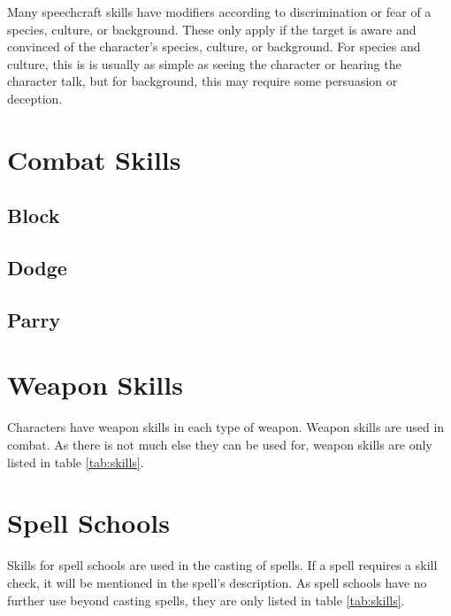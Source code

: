 \begin{multicols*}{2}
    Many speechcraft skills have modifiers according to discrimination or fear of
    a species, culture, or background. These only apply if the target is aware and
    convinced of the character's species, culture, or background. For species and
    culture, this is is usually as simple as seeing the character or hearing the
    character talk, but for background, this may require some persuasion or
    deception.

    \section{Combat Skills}

    \subsection*{Block}\label{skill:block}

    \subsection*{Dodge}\label{skill:dodge}

    \subsection*{Parry}\label{skill:parry}

    \section{Weapon Skills}\label{weapon-skills}
    Characters have weapon skills in each type of weapon. Weapon skills are used in
    combat. As there is not much else they can be used for, weapon skills are only
    listed in table \ref{tab:skills}.


    \section{Spell Schools}\label{spell-schools}
    Skills for spell schools are used in the casting of spells. If a spell requires
    a skill check, it will be mentioned in the spell's description. As spell
    schools have no further use beyond casting spells, they are only listed in
    table \ref{tab:skills}.
\end{multicols*}

